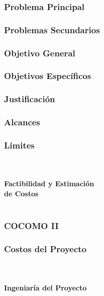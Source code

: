 \documentclass[xcolor=dvipsnames]{beamer}
\begin{document}
\begin{frame}
    \frametitle{Problema Principal}
\end{frame}

\begin{frame}
    \frametitle{Problemas Secundarios}
\end{frame}

\begin{frame}
    \frametitle{Objetivo General}
\end{frame}

\begin{frame}
    \frametitle{Objetivos Específicos}
\end{frame}

\begin{frame}
    \frametitle{Justificación}
\end{frame}

\begin{frame}
    \frametitle{Alcances}
\end{frame}

\begin{frame}
    \frametitle{Límites}
\end{frame}

\begin{frame}
    \centering\color{color3}{\rule{10cm}{5pt}}\\
    \vspace{-3mm}
    \centering\color{color3}{\rule{10cm}{1.5pt}}\\
    \vspace{2mm}
    \centering\textbf{\huge{\textcolor{color1}{Factibilidad y Estimación\\ de Costos}}}\\
    \centering\color{color3}{\rule{10cm}{1.5pt}}\\
\end{frame}

\begin{frame}
    \frametitle{COCOMO II}
\end{frame}

\begin{frame}
    \frametitle{Costos del Proyecto}
\end{frame}

\begin{frame}
    \centering\color{color3}{\rule{10cm}{5pt}}\\
    \vspace{-3mm}
    \centering\color{color3}{\rule{10cm}{1.5pt}}\\
    \vspace{2mm}
    \centering\textbf{\huge{\textcolor{color1}{Ingeniaría del Proyecto}}}\\
    \centering\color{color3}{\rule{10cm}{1.5pt}}\\
\end{frame}
\end{document}

